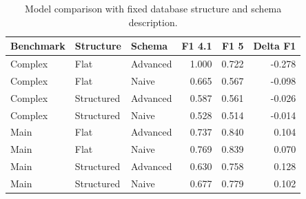 \begin{table}[htbp]
\centering
\small
\caption{Model comparison with fixed database structure and schema description.}
\label{tab:model-comparison}
\begin{tabular}{lllrrr}
\toprule
Benchmark & Structure & Schema & F1 4.1 & F1 5 & Delta F1 \\
\midrule
Complex & Flat & Advanced & 1.000 & 0.722 & -0.278 \\
Complex & Flat & Naive & 0.665 & 0.567 & -0.098 \\
Complex & Structured & Advanced & 0.587 & 0.561 & -0.026 \\
Complex & Structured & Naive & 0.528 & 0.514 & -0.014 \\
Main & Flat & Advanced & 0.737 & 0.840 & 0.104 \\
Main & Flat & Naive & 0.769 & 0.839 & 0.070 \\
Main & Structured & Advanced & 0.630 & 0.758 & 0.128 \\
Main & Structured & Naive & 0.677 & 0.779 & 0.102 \\
\bottomrule
\end{tabular}
\end{table}
